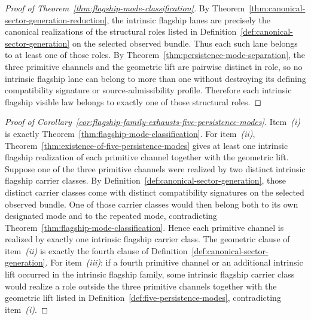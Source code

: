 \begin{proof}[Proof of Theorem~\ref{thm:flagship-mode-classification}]
\label{proof:thm:flagship-mode-classification}
By Theorem~\ref{thm:canonical-sector-generation-reduction}, the intrinsic
flagship lanes are precisely the canonical realizations of the structural
roles listed in Definition~\ref{def:canonical-sector-generation} on the
selected observed bundle. Thus each such lane belongs to at least one of those
roles. By Theorem~\ref{thm:persistence-mode-separation}, the three primitive
channels and the geometric lift are pairwise distinct in role, so no intrinsic
flagship lane can belong to more than one without destroying its defining
compatibility signature or source-admissibility profile. Therefore each
intrinsic flagship visible law belongs to exactly one of those structural
roles.
\end{proof}

\begin{proof}[Proof of Corollary~\ref{cor:flagship-family-exhausts-five-persistence-modes}]
\label{proof:cor:flagship-family-exhausts-five-persistence-modes}
Item~\emph{(i)} is exactly
Theorem~\ref{thm:flagship-mode-classification}. For item~\emph{(ii)},
Theorem~\ref{thm:existence-of-five-persistence-modes} gives at least one
intrinsic flagship realization of each primitive channel together with the
geometric lift. Suppose one of the three primitive channels were realized by
two distinct intrinsic flagship carrier classes. By
Definition~\ref{def:canonical-sector-generation}, those distinct carrier
classes come with distinct compatibility signatures on the selected observed
bundle. One of those carrier classes would then belong both to its own
designated mode and to the repeated mode, contradicting
Theorem~\ref{thm:flagship-mode-classification}. Hence each primitive channel is
realized by exactly one intrinsic flagship carrier class. The geometric clause
of item~\emph{(ii)} is exactly the fourth clause of
Definition~\ref{def:canonical-sector-generation}. For item~\emph{(iii)}: if a
fourth primitive channel or an additional intrinsic lift occurred in the
intrinsic flagship family, some intrinsic flagship carrier class would realize
a role outside the three primitive channels together with the geometric lift
listed in Definition~\ref{def:five-persistence-modes},
contradicting item~\emph{(i)}.
\end{proof}

